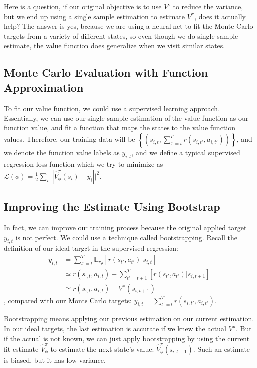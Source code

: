 Here is a question, if our original objective is to use $V^\pi$ to reduce the variance, but we end up using a single sample estimation to estimate $V^\pi$, does it actually help? The answer is yes, because we are using a neural net to fit the Monte Carlo targets from a variety of different states, so even though we do single sample estimate, the value function does generalize when we visit similar states. 

\subsection{Monte Carlo Evaluation with Function Approximation}
To fit our value function, we could use a supervised learning approach. Essentially, we can use our single sample estimation of the value function as our function value, and fit a function that maps the states to the value function values. Therefore, our training data will be $\left\{(s_{i,t}, \sum_{t'=t}^Tr(s_{i,t'},a_{i,t'}))\right\}$, and we denote the function value labels as $y_{i,t}$, and we define a typical supervised regression loss function which we try to minimize as $\mathcal{L}(\phi) = \frac{1}{2}\sum_i\lvert|\hat{V}_\phi^\pi(s_i)-y_i|\rvert^2$. 

\subsection{Improving the Estimate Using Bootstrap}
In fact, we can improve our training process because the original applied target $y_{i,t}$ is not perfect. We could use a technique called bootstrapping. Recall the definition of our ideal target in the supervised regression:
$$\begin{aligned}
    y_{i,t} &= \sum_{t'=t}^T\mathbb{E}_{\pi_\theta}\left[r(s_{t'},a_{t'})|s_{i,t}\right]\\
    & \simeq r(s_{i,t},a_{i,t})+\sum_{t'=t+1}^T\left[r(s_{t'},a_{t'})|s_{i,t+1}\right]\\
    & \simeq  r(s_{i,t},a_{i,t}) + V^\pi(s_{i,t+1})
\end{aligned}$$
, compared with our Monte Carlo targets: $y_{i,t} = \sum_{t'=t}^T r(s_{i,t'},a_{i,t'})$.

Bootstrapping means applying our previous estimation on our current estimation. In our ideal targets, the last estimation is accurate if we knew the actual $V^\pi$. But if the actual is not known, we can just apply bootstrapping by using the current fit estimate $\hat{V}^\pi_\phi$ to estimate the next state's value: $\hat{V}^\pi_\phi(s_{i,t+1})$. Such an estimate is biased, but it has low variance.

